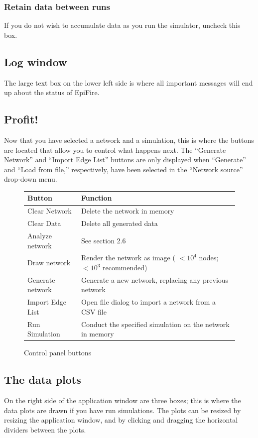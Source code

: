 \documentclass{article}
\begin{document}
\subsubsection{Retain data between runs}
If you do not wish to accumulate data as you run the simulator, uncheck this box.

\subsection{Log window}
The large text box on the lower left side is where all important messages will end up about the status of EpiFire.


\subsection{Profit!}
Now that you have selected a network and a simulation, this is where the buttons are located that allow you to control what happens next. The ``Generate Network'' and ``Import Edge List'' buttons are only displayed when ``Generate'' and ``Load from file,'' respectively, have been selected in the ``Network source'' drop-down menu.

\UndefineShortVerb{\|}
\begin{figure}[h]
\begin{center}
\begin{tabular}{|l|l|}
\hline
Button & Function \\ \hline
Clear Network & Delete the network in memory\\ 
Clear Data & Delete all generated data\\ 
Analyze network & See section 2.6\\ 
Draw network & Render the network as image ( $< 10^4$ nodes; $< 10^3$ recommended)\\
Generate network & Generate a new network, replacing any previous network\\ 
Import Edge List & Open file dialog to import a network from a CSV file\\ 
Run Simulation & Conduct the specified simulation on the network in memory\\ 
\hline
\end{tabular}
\caption{Control panel buttons}
\end{center}
\end{figure}
\DefineShortVerb{\|}


\subsection{The data plots}
On the right side of the application window are three boxes; this is where the data plots are drawn if you have run simulations.  The plots can be resized by resizing the application window, and by clicking and dragging the horizontal dividers between the plots.
\end{document}
